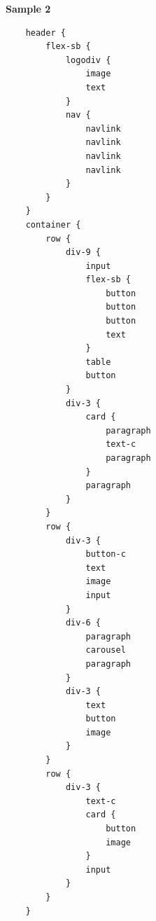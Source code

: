     
\textbf{Sample 2}
\begin{verbatim}
    header {
        flex-sb {
            logodiv {
                image
                text
            }
            nav {
                navlink
                navlink
                navlink
                navlink
            }
        }
    }
    container {
        row {
            div-9 {
                input
                flex-sb {
                    button
                    button
                    button
                    text
                }
                table
                button
            }
            div-3 {
                card {
                    paragraph
                    text-c
                    paragraph
                }
                paragraph
            }
        }
        row {
            div-3 {
                button-c
                text
                image
                input
            }
            div-6 {
                paragraph
                carousel
                paragraph
            }
            div-3 {
                text
                button
                image
            }
        }
        row {
            div-3 {
                text-c
                card {
                    button
                    image
                }
                input
            }
        }
    }
    \end{verbatim}    

